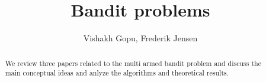 \documentclass[letterpaper]{article}
\title{Bandit problems}
\author{Vishakh Gopu,  Frederik Jensen} %
\begin{document}
\maketitle

\begin{abstract}
  We review three papers related to the multi armed bandit problem and discuss
  the main conceptual ideas and anlyze the algorithms and theoretical results. 
\end{abstract}


\unskip

\unskip

\unskip

\unskip

\unskip
%



\appendix
\end{document}
